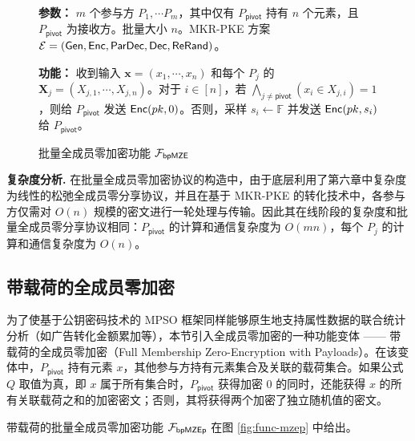 \begin{figure}[!htb]
\begin{framed}
\begin{minipage}[c]{\textwidth}
\begin{trivlist}
\item \textbf{参数：} $m$ 个参与方 $P_1, \cdots P_m$，其中仅有 $P_\mathsf{pivot}$ 持有 $n$ 个元素，且 $P_\mathsf{pivot}$ 为接收方。批量大小 $n$。MKR-PKE 方案 $\mathcal{E} = (\mathsf{Gen}, \mathsf{Enc}, \mathsf{ParDec}, \mathsf{Dec}, \mathsf{ReRand})$。
\item \textbf{功能：} 收到输入 $\textbf{x} = (x_1, \cdots, x_n)$ 和每个 $P_j$ 的 $\textbf{X}_j = (X_{j,1}, \cdots, X_{j,n})$。对于 $i \in [n]$，若 $\bigwedge_{j \neq \mathsf{pivot}} (x_i \in X_{j,i}) = 1$，则给 $P_\mathsf{pivot}$ 发送 $\mathsf{Enc}(pk,0)$。否则，采样 $s_i \gets \mathbb{F}$ 并发送 $\mathsf{Enc}(pk,s_i)$ 给 $P_\mathsf{pivot}$。
\end{trivlist}
\end{minipage}
\end{framed}
\caption{批量全成员零加密功能 $\mathcal{F}_\mathsf{bpMZE}$}\label{fig:func-bpmze}
\end{figure}

\begin{trivlist}
\item \textbf{复杂度分析.} 在批量全成员零加密协议的构造中，由于底层利用了第六章中复杂度为线性的松弛全成员零分享协议，并且在基于 MKR-PKE 的转化技术中，各参与方仅需对 $O(n)$ 规模的密文进行一轮处理与传输。因此其在线阶段的复杂度和批量全成员零分享协议相同：$P_\mathsf{pivot}$ 的计算和通信复杂度为 $O(mn)$，每个 $P_j$ 的计算和通信复杂度为 $O(n)$。 
\end{trivlist}

\subsection{带载荷的全成员零加密}

为了使基于公钥密码技术的 MPSO 框架同样能够原生地支持属性数据的联合统计分析（如广告转化金额累加等），本节引入全成员零加密的一种功能变体 —— 带载荷的全成员零加密（Full Membership Zero-Encryption with Payloads）。在该变体中，$P_\mathsf{pivot}$ 持有元素 $x$，其他参与方持有元素集合及关联的载荷集合。如果公式 $Q$ 取值为真，即 $x$ 属于所有集合时，$P_\mathsf{pivot}$ 获得加密 0 的同时，还能获得 $x$ 的所有关联载荷之和的加密密文；否则，其将获得两个加密了独立随机值的密文。

带载荷的批量全成员零加密功能 $\mathcal{F}_\mathsf{bpMZEp}$ 在图 \ref{fig:func-mzep} 中给出。

